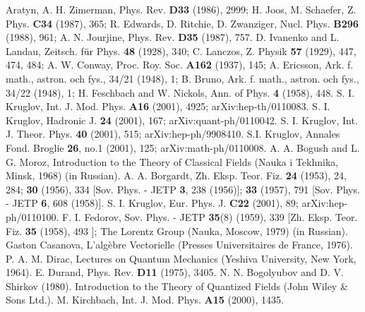 \documentclass[a4paper,12pt]{article}
\begin{document}
\begin{thebibliography}{99}
Aratyn, A. H. Zimerman,  Phys. Rev. \textbf{D33} (1986), 2999; H.
Joos, M. Schaefer,  Z. Phys. \textbf{C34} (1987), 365; R. Edwards,
D. Ritchie, D. Zwanziger,  Nucl. Phys. \textbf{B296} (1988), 961;
A. N. Jourjine,  Phys. Rev. \textbf{D35} (1987), 757.
 D. Ivanenko and L. Landau, Zeitsch. f\"ur Phys. \textbf{
48} (1928), 340; C. Lanczos, Z. Physik \textbf{57} (1929), 447,
474, 484; A. W. Conway, Proc. Roy. Soc. \textbf{A162} (1937), 145;
A. Ericsson,  Ark. f. math., astron. och fys., 34/21 (1948), 1; B.
Bruno, Ark. f. math., astron. och fys., 34/22 (1948), 1; H.
Feschbach and W. Nickols,  Ann. of Phys. \textbf{4} (1958), 448.
 S. I. Kruglov, Int. J. Mod. Phys. {\bf A16} (2001), 4925;
arXiv:hep-th/0110083.
 S. I. Kruglov, Hadronic J. {\bf 24} (2001), 167;
arXiv:quant-ph/0110042.
 S. I. Kruglov, Int. J. Theor. Phys. {\bf 40} (2001),
515; arXiv:hep-ph/9908410.
 S.I. Kruglov, Annales Fond. Broglie {\bf 26}, no.1 (2001), 125;
arXiv:math-ph/0110008.
 A. A. Bogush and L. G. Moroz,  Introduction to the
Theory of Classical Fields (Nauka i Tekhnika, Minsk, 1968) (in
Russian).
 A. A. Borgardt, Zh. Eksp. Teor. Fiz. \textbf{24} (1953), 24,
284; \textbf{30} (1956), 334 [Sov. Phys. - JETP \textbf{3}, 238
(1956)]; \textbf{33} (1957), 791 [Sov. Phys. - JETP \textbf{6},
608 (1958)].
 S. I. Kruglov, Eur. Phys. J. {\bf C22} (2001),
89; arXiv:hep-ph/0110100.
  F. I. Fedorov,  Sov. Phys. - JETP \textbf{35}(8) (1959), 339
[Zh. Eksp. Teor. Fiz. \textbf{35} (1958), 493 ]; The Lorentz Group
(Nauka, Moscow, 1979) (in Russian).
  Gaston Casanova,  L'alg\`ebre Vectorielle
(Presses Universitaires de France, 1976).
 P. A. M. Dirac, Lectures on Quantum Mechanics
(Yeshiva University, New York, 1964).
 E. Durand,  Phys. Rev. \textbf{D11} (1975), 3405.
  N. N. Bogolyubov and D. V. Shirkov (1980). Introduction to the
Theory of Quantized Fields (John Wiley \& Sons Ltd.).
 M. Kirchbach, Int. J. Mod. Phys. {\bf A15} (2000), 1435.

\end{thebibliography}
\end{document}
